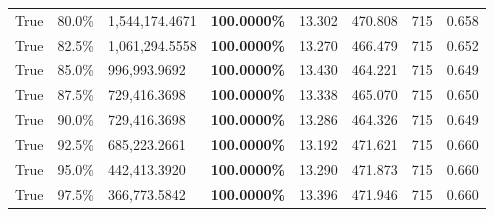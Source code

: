 \begin{table}[H]
\begin{tabular}{lllrllll}
\cline{1-8}
True & 80.0\% & 1,544,174.4671 & \bfseries \color{red} 100.0000\% & 13.302 & 470.808 & 715 & 0.658 \\
\cline{1-8}
True & 82.5\% & 1,061,294.5558 & \bfseries \color{red} 100.0000\% & 13.270 & 466.479 & 715 & 0.652 \\
\cline{1-8}
True & 85.0\% & 996,993.9692 & \bfseries \color{red} 100.0000\% & 13.430 & 464.221 & 715 & 0.649 \\
\cline{1-8}
True & 87.5\% & 729,416.3698 & \bfseries \color{red} 100.0000\% & 13.338 & 465.070 & 715 & 0.650 \\
\cline{1-8}
True & 90.0\% & 729,416.3698 & \bfseries \color{red} 100.0000\% & 13.286 & 464.326 & 715 & 0.649 \\
\cline{1-8}
True & 92.5\% & 685,223.2661 & \bfseries \color{red} 100.0000\% & 13.192 & 471.621 & 715 & 0.660 \\
\cline{1-8}
True & 95.0\% & 442,413.3920 & \bfseries \color{red} 100.0000\% & 13.290 & 471.873 & 715 & 0.660 \\
\cline{1-8}
True & 97.5\% & 366,773.5842 & \bfseries \color{red} 100.0000\% & 13.396 & 471.946 & 715 & 0.660 \\
\cline{1-8}
\bottomrule
\end{tabular}
\end{table}
